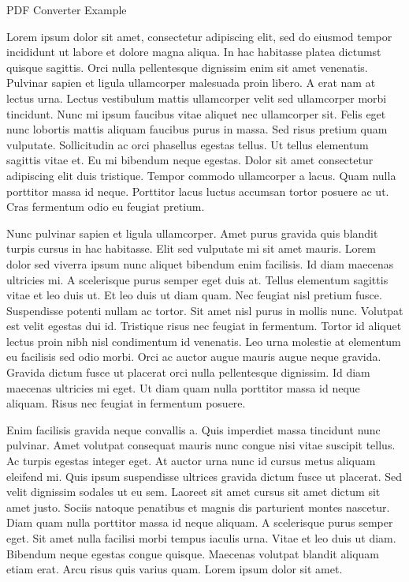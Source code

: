 \documentclass[12pt]{article}
\begin{document}
\begin{flushleft}
\begin{center} \large PDF Converter Example \end{center}
\setlength{\parindent}{.5in}

Lorem ipsum dolor sit amet, consectetur adipiscing elit, sed do eiusmod tempor incididunt ut labore et dolore magna aliqua. In hac habitasse platea dictumst quisque sagittis. Orci nulla pellentesque dignissim enim sit amet venenatis. Pulvinar sapien et ligula ullamcorper malesuada proin libero. A erat nam at lectus urna. Lectus vestibulum mattis ullamcorper velit sed ullamcorper morbi tincidunt. Nunc mi ipsum faucibus vitae aliquet nec ullamcorper sit. Felis eget nunc lobortis mattis aliquam faucibus purus in massa. Sed risus pretium quam vulputate. Sollicitudin ac orci phasellus egestas tellus. Ut tellus elementum sagittis vitae et. Eu mi bibendum neque egestas. Dolor sit amet consectetur adipiscing elit duis tristique. Tempor commodo ullamcorper a lacus. Quam nulla porttitor massa id neque. Porttitor lacus luctus accumsan tortor posuere ac ut. Cras fermentum odio eu feugiat pretium.

Nunc pulvinar sapien et ligula ullamcorper. Amet purus gravida quis blandit turpis cursus in hac habitasse. Elit sed vulputate mi sit amet mauris. Lorem dolor sed viverra ipsum nunc aliquet bibendum enim facilisis. Id diam maecenas ultricies mi. A scelerisque purus semper eget duis at. Tellus elementum sagittis vitae et leo duis ut. Et leo duis ut diam quam. Nec feugiat nisl pretium fusce. Suspendisse potenti nullam ac tortor. Sit amet nisl purus in mollis nunc. Volutpat est velit egestas dui id. Tristique risus nec feugiat in fermentum. Tortor id aliquet lectus proin nibh nisl condimentum id venenatis. Leo urna molestie at elementum eu facilisis sed odio morbi. Orci ac auctor augue mauris augue neque gravida. Gravida dictum fusce ut placerat orci nulla pellentesque dignissim. Id diam maecenas ultricies mi eget. Ut diam quam nulla porttitor massa id neque aliquam. Risus nec feugiat in fermentum posuere.

Enim facilisis gravida neque convallis a. Quis imperdiet massa tincidunt nunc pulvinar. Amet volutpat consequat mauris nunc congue nisi vitae suscipit tellus. Ac turpis egestas integer eget. At auctor urna nunc id cursus metus aliquam eleifend mi. Quis ipsum suspendisse ultrices gravida dictum fusce ut placerat. Sed velit dignissim sodales ut eu sem. Laoreet sit amet cursus sit amet dictum sit amet justo. Sociis natoque penatibus et magnis dis parturient montes nascetur. Diam quam nulla porttitor massa id neque aliquam. A scelerisque purus semper eget. Sit amet nulla facilisi morbi tempus iaculis urna. Vitae et leo duis ut diam. Bibendum neque egestas congue quisque. Maecenas volutpat blandit aliquam etiam erat. Arcu risus quis varius quam. Lorem ipsum dolor sit amet.


\end{flushleft}
\end{document}
